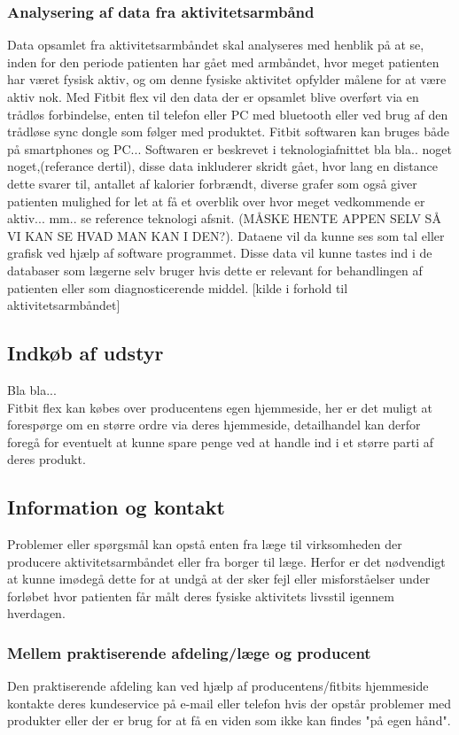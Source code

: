 \subsubsection{Analysering af data fra aktivitetsarmbånd}  
Data opsamlet fra aktivitetsarmbåndet skal analyseres med henblik på at se, inden for den periode patienten har gået med armbåndet, hvor meget patienten har været fysisk aktiv, og om denne fysiske aktivitet opfylder målene for at være aktiv nok.  
Med Fitbit flex vil den data der er opsamlet blive overført via en trådløs forbindelse, enten til telefon eller PC med bluetooth eller ved brug af den trådløse sync dongle som følger med produktet. Fitbit softwaren kan bruges både på smartphones og PC... Softwaren er beskrevet i teknologiafnittet bla bla.. noget noget,(referance dertil), disse data inkluderer skridt gået, hvor lang en distance dette svarer til, antallet af kalorier forbrændt, diverse grafer som også giver patienten mulighed for let at få et overblik over hvor meget vedkommende er aktiv... mm.. se reference teknologi afsnit. (MÅSKE HENTE APPEN SELV SÅ VI KAN SE HVAD MAN KAN I DEN?). Dataene vil da kunne ses som tal eller grafisk ved hjælp af software programmet. Disse data vil kunne tastes ind i de databaser som lægerne selv bruger hvis dette er relevant for behandlingen af patienten eller som diagnosticerende middel. [kilde i forhold til aktivitetsarmbåndet]

\subsection{Indkøb af udstyr}	
Bla bla...\\
Fitbit flex kan købes over producentens egen hjemmeside, her er det muligt at forespørge om en større ordre via deres hjemmeside, detailhandel kan derfor foregå for eventuelt at kunne spare penge ved at handle ind i et større parti af deres produkt.

\subsection{Information og kontakt}
Problemer eller spørgsmål kan opstå enten fra læge til virksomheden der producere aktivitetsarmbåndet eller fra borger til læge. Herfor er det nødvendigt at kunne imødegå dette   for at undgå at der sker fejl eller misforståelser under forløbet hvor patienten får målt deres fysiske aktivitets livsstil igennem hverdagen. 

\subsubsection{Mellem praktiserende afdeling/læge og producent}
Den praktiserende afdeling kan ved hjælp af producentens/fitbits hjemmeside kontakte deres kundeservice på e-mail eller telefon hvis der opstår problemer med produkter eller der er brug for at få en viden som ikke kan findes "på egen hånd". 

